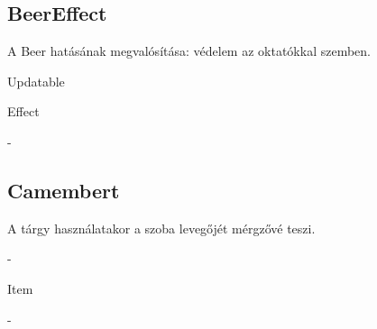 \subsection{BeerEffect}
\begin{class-template-responsibility}
    A Beer hatásának megvalósítása: védelem az oktatókkal szemben.
\end{class-template-responsibility}
\begin{class-template-interface}
    Updatable
\end{class-template-interface}
\begin{class-template-baseclass}
    Effect
\end{class-template-baseclass}
\begin{class-template-attribute}
    -
\end{class-template-attribute}
\begin{class-template-method}
\end{class-template-method}

\subsection{Camembert}
\begin{class-template-responsibility}
    A tárgy használatakor a szoba levegőjét mérgzővé teszi.
\end{class-template-responsibility}
\begin{class-template-interface}
    -
\end{class-template-interface}
\begin{class-template-baseclass}
    Item
\end{class-template-baseclass}
\begin{class-template-attribute}
    -
\end{class-template-attribute}
\begin{class-template-method}
\end{class-template-method}

